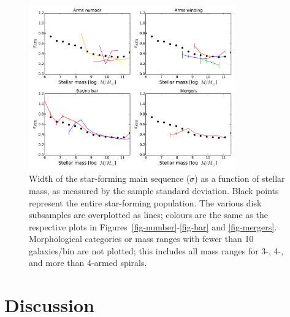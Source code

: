 \documentclass{emulateapj}
\begin{document}
\begin{figure}
\includegraphics[angle=0,width=3.5in]{figures/sigma_mstar.pdf}
\caption{Width of the star-forming main sequence ($\sigma$) as a function of stellar mass, as measured by the sample standard deviation. Black points represent the entire star-forming population. The various disk subsamples are overplotted as lines; colours are the same as the respective plots in Figures~\ref{fig-number}-\ref{fig-bar} and \ref{fig-mergers}. Morphological categories or mass ranges with fewer than 10 galaxies/bin are not plotted; this includes all mass ranges for 3-, 4-, and more than 4-armed spirals.
\label{fig-sigma}}
\end{figure}


\section{Discussion}\label{sec-discussion}
\end{document}
